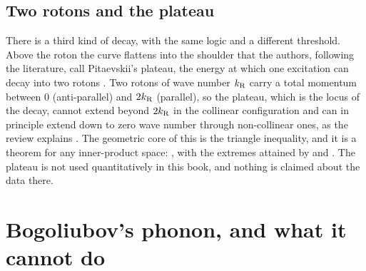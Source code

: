 \subsection{Two rotons and the plateau}
There is a third kind of decay, with the same logic and a different threshold.
Above the roton the curve flattens into the shoulder that the authors, following the literature, call Pitaevskii's plateau, the energy at which one excitation can decay into two rotons \cite{Godfrin2021,GodfrinKrotscheck2022}.
Two rotons of wave number $k_{\rm R}$ carry a total momentum between $0$ (anti-parallel) and $2k_{\rm R}$ (parallel), so the plateau, which is the locus of the decay, cannot extend beyond $2k_{\rm R}$ in the collinear configuration and can in principle extend down to zero wave number through non-collinear ones, as the review explains \cite{GodfrinKrotscheck2022}.
The geometric core of this is the triangle inequality, and it is a theorem for any inner-product space: , with the extremes attained by  and .
The plateau is not used quantitatively in this book, and nothing is claimed about the data there.

\section{Bogoliubov's phonon, and what it cannot do}\label{ch05:sec-bogoliubov}

